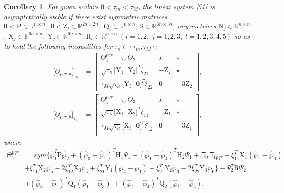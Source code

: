 \documentclass[preprint,11pt]{elsarticle}
\newtheorem{Cor}{Corollary}
\begin{document}
\vspace{-0.6cm}
\begin{Cor}\label{cor1}
For given scalars $0<\tau_m<\tau_M$, the linear system \eqref{51} is asymptotically stable if there exist symmetric matrices $0<\mathrm{P}\in  \mathbb{R}^{n\times n},\; 0<\mathrm{Z}_i\in \mathbb{R}^{2n\times 2n},\;\mathrm{Q}_i\in \mathbb{R}^{n\times n}$, $\mathrm{S}\in \mathbb{R}^{3n\times 3n}$, any matrices $ \mathrm{N}_j\in \mathbb{R}^{n\times n}$, $ \mathrm{X}_j\in \mathbb{R}^{6n\times n}$, $ \mathrm{Y}_j\in \mathbb{R}^{6n\times n}$, $\mathrm{R}_l\in \mathbb{R}^{n\times n}\;(i=1,2,\;j=1,2,3,\;l=1,2,3,4,5)$ so as to hold the following inequalities for $\tau_\kappa\in\{ \tau_m,\tau_M \}$:
\begin{align*}
\big[ \Theta_{pqr,a}\big]_{\tau_\kappa}&=
 \begin{bmatrix}
 \Theta_1^{pqr}+\tau_\kappa\Theta_2& \star&\star\\
 \sqrt{\tau_\kappa}\big[ \mathrm{Y}_1\;\;\mathrm{Y}_2 \big]^T\xi_{21}&-\mathrm{Z}_2&\star\\
 \tau_M \sqrt{\tau_\kappa}\big[ \mathrm{Y}_3\;\;\mathbf{0} \big]^T\xi_{22}&\mathbf{0}&-3\mathrm{Z}_2
 \end{bmatrix},\\
\big[ \Theta_{pqr,b}\big]_{\tau_\kappa}&=
 \begin{bmatrix}
 \Theta_1^{pqr}+\tau_\kappa\Theta_3& \star&\star\\
 \sqrt{\tau_\kappa}\big[ \mathrm{X}_1\;\;\mathrm{X}_2 \big]^T\xi_{11}&-\mathrm{Z}_1&\star\\
 \tau_M \sqrt{\tau_\kappa}\big[ \mathrm{X}_3\;\;\mathbf{0} \big]^T\xi_{12}&\mathbf{0}&-3\mathrm{Z}_1\\
 \end{bmatrix},
\end{align*}
where
\begin{align*}
\Theta_1^{pqr}&=sym\big\{\hat{\wp}^T_1\mathrm{P}\hat{\wp}_2+(\hat{\wp}_3-\hat{\wp}_1)^T\mathrm{H}_1\Psi_1+(\hat{\wp}_1-\hat{\wp}_4)^T\mathrm{H}_2\Psi_1
+\Xi_0\Xi_{1pqr}+ \xi_{11}^T \mathrm{X}_1(\hat{\wp}_1-\hat{\wp}_3)\\
&+\xi_{11}^T\mathrm{X}_2\hat{\wp}_5-2\xi_{12}^T\mathrm{X}_3\hat{\wp}_5
+\xi_{21}^T \mathrm{Y}_1(\hat{\wp}_4-\hat{\wp}_1)+\xi_{21}^T\mathrm{Y}_2\hat{\wp}_6-2\xi_{22}^T\mathrm{Y}_3\hat{\wp}_6
\big\}-\Psi_2^T\mathrm{R}\Psi_2\\
&+(\hat{\wp}_3-\hat{\wp}_1)^T\mathrm{Q}_1(\hat{\wp}_1-\hat{\wp}_3)\;
+(\hat{\wp}_1-\hat{\wp}_4)^T\mathrm{Q}_2(\hat{\wp}_1-\hat{\wp}_4),\\

\end{align*}
\end{Cor}
\end{document}
